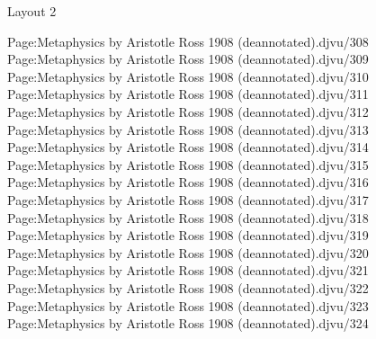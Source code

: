 
Layout 2

Page:Metaphysics by Aristotle Ross 1908 (deannotated).djvu/308 Page:Metaphysics by Aristotle Ross 1908 (deannotated).djvu/309 Page:Metaphysics by Aristotle Ross 1908 (deannotated).djvu/310 Page:Metaphysics by Aristotle Ross 1908 (deannotated).djvu/311 Page:Metaphysics by Aristotle Ross 1908 (deannotated).djvu/312 Page:Metaphysics by Aristotle Ross 1908 (deannotated).djvu/313 Page:Metaphysics by Aristotle Ross 1908 (deannotated).djvu/314 Page:Metaphysics by Aristotle Ross 1908 (deannotated).djvu/315 Page:Metaphysics by Aristotle Ross 1908 (deannotated).djvu/316 Page:Metaphysics by Aristotle Ross 1908 (deannotated).djvu/317 Page:Metaphysics by Aristotle Ross 1908 (deannotated).djvu/318 Page:Metaphysics by Aristotle Ross 1908 (deannotated).djvu/319 Page:Metaphysics by Aristotle Ross 1908 (deannotated).djvu/320 Page:Metaphysics by Aristotle Ross 1908 (deannotated).djvu/321 Page:Metaphysics by Aristotle Ross 1908 (deannotated).djvu/322 Page:Metaphysics by Aristotle Ross 1908 (deannotated).djvu/323 Page:Metaphysics by Aristotle Ross 1908 (deannotated).djvu/324
